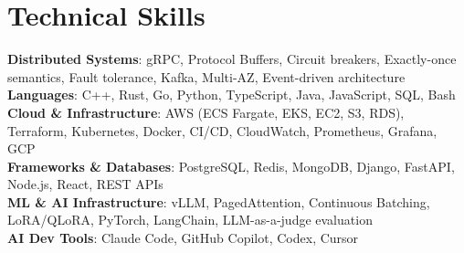 \documentclass[letterpaper,11pt]{article}
\begin{document}
\section{Technical Skills}
\vspace{-7pt}
\begin{itemize}
[leftmargin=0.15in, label={}]\small{\item{
        \textbf{Distributed Systems}{: gRPC, Protocol Buffers, Circuit breakers, Exactly-once semantics, Fault tolerance, Kafka, Multi-AZ, Event-driven architecture} \\
        \textbf{Languages}{: C++, Rust, Go, Python, TypeScript, Java, JavaScript, SQL, Bash} \\
        \textbf{Cloud \& Infrastructure}{: AWS (ECS Fargate, EKS, EC2, S3, RDS), Terraform, Kubernetes, Docker, CI/CD, CloudWatch, Prometheus, Grafana, GCP} \\
        \textbf{Frameworks \& Databases}{: PostgreSQL, Redis, MongoDB, Django, FastAPI, Node.js, React, REST APIs} \\
        \textbf{ML \& AI Infrastructure}{: vLLM, PagedAttention, Continuous Batching, LoRA/QLoRA, PyTorch, LangChain, LLM-as-a-judge evaluation} \\
        \textbf{AI Dev Tools}{: Claude Code, GitHub Copilot, Codex, Cursor} \\
}}
\end{itemize}
\end{document}
